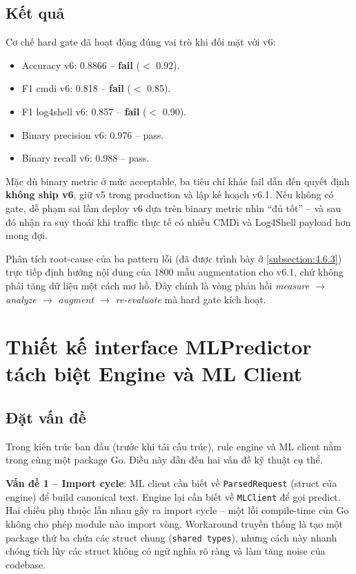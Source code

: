 \documentclass[../DoAn.tex]{subfiles}
\begin{document}
\subsection{Kết quả}
\label{subsection:5.3.3}

Cơ chế hard gate đã hoạt động đúng vai trò khi đối mặt với v6:

\begin{itemize}[leftmargin=*]
    \item Accuracy v6: 0.8866 -- \textbf{fail} (\(<\) 0.92).
    \item F1 cmdi v6: 0.818 -- \textbf{fail} (\(<\) 0.85).
    \item F1 log4shell v6: 0.857 -- \textbf{fail} (\(<\) 0.90).
    \item Binary precision v6: 0.976 -- pass.
    \item Binary recall v6: 0.988 -- pass.
\end{itemize}

Mặc dù binary metric ở mức acceptable, ba tiêu chí khác fail dẫn đến quyết
định \textbf{không ship v6}, giữ v5 trong production và lập kế hoạch
v6.1. Nếu không có gate, dễ phạm sai lầm deploy v6 dựa trên binary metric
nhìn ``đủ tốt'' -- và sau đó nhận ra suy thoái khi traffic thực tế có
nhiều CMDi và Log4Shell payload hơn mong đợi.

Phân tích root-cause của ba pattern lỗi (đã được trình bày ở
\ref{subsection:4.6.3}) trực tiếp định hướng nội dung của 1800 mẫu
augmentation cho v6.1, chứ không phải tăng dữ liệu một cách mơ hồ. Đây
chính là vòng phản hồi \textit{measure \(\to\) analyze \(\to\) augment
\(\to\) re-evaluate} mà hard gate kích hoạt.

\section{Thiết kế interface MLPredictor tách biệt Engine và ML Client}
\label{section:5.4}

\subsection{Đặt vấn đề}
\label{subsection:5.4.1}

Trong kiến trúc ban đầu (trước khi tái cấu trúc), rule engine và ML client
nằm trong cùng một package Go. Điều này dẫn đến hai vấn đề kỹ thuật cụ thể.

\textbf{Vấn đề 1 -- Import cycle}: ML client cần biết về \texttt{ParsedRequest}
(struct của engine) để build canonical text. Engine lại cần biết về
\texttt{MLClient} để gọi predict. Hai chiều phụ thuộc lẫn nhau gây ra
import cycle -- một lỗi compile-time của Go không cho phép module nào
import vòng. Workaround truyền thống là tạo một package thứ ba chứa các
struct chung (\texttt{shared types}), nhưng cách này nhanh chóng tích lũy
các struct không có ngữ nghĩa rõ ràng và làm tăng noise của codebase.
\end{document}
